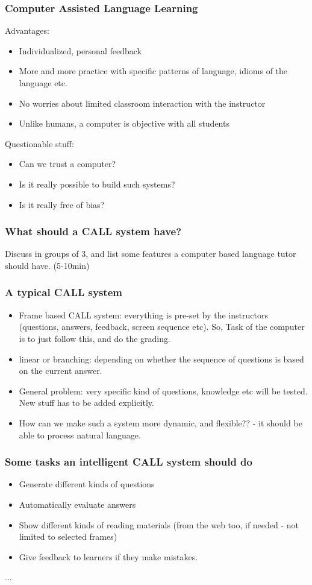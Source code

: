 \documentclass{beamer}
\begin{document}
\begin{frame}
\frametitle{Computer Assisted Language Learning}
Advantages: 
\begin{itemize}
\item Individualized, personal feedback
\item More and more practice with specific patterns of language, idioms of the language etc. 
\item No worries about limited classroom interaction with the instructor
\item Unlike humans, a computer is objective with all students
\end{itemize} \pause
Questionable stuff: 
\begin{itemize}
\item Can we trust a computer?
\item Is it really possible to build such systems?  
\item Is it really free of bias?
\end {itemize}
\end{frame}

\begin{frame}
\frametitle{What should a CALL system have?}
Discuss in groups of 3, and list some features a computer based language tutor should have. (5-10min)
\end{frame}

\begin{frame}
\frametitle{A typical CALL system}
\begin{itemize}
\item Frame based CALL system: everything is pre-set by the instructors (questions, answers, feedback, screen sequence etc). So, Task of the computer is to just follow this, and do the grading. 
\item linear or branching: depending on whether the sequence of questions is based on the current answer. \pause
\item General problem: very specific kind of questions, knowledge etc will be tested. New stuff has to be added explicitly. 
\item How can we make such a system more dynamic, and flexible?? \pause - it should be able to process natural language.
\end{itemize}
\end{frame}

\begin{frame}
\frametitle{Some tasks an intelligent CALL system should do}
\begin{itemize}
\item Generate different kinds of questions
\item Automatically evaluate answers
\item Show different kinds of reading materials (from the web too, if needed - not limited to selected frames)
\item Give feedback to learners if they make mistakes.
\end{itemize}
... 
\end{frame}
\end{document}
